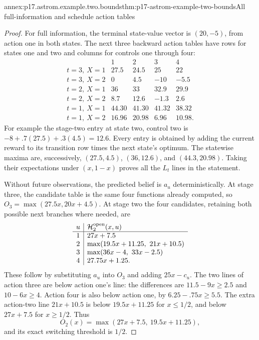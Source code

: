 \begin{annexitem}{annex:p17.astrom.example.two.bounds}{thm:p17-astrom-example-two-bounds}{All full-information and schedule action tables}
\begin{proof}
For full information, the terminal state-value vector
is \((20,-5)\), from action one in both states.
The next three backward action tables have rows
for states one and two and columns for controls
one through four:
\[
 \begin{array}{c|rrrr}
  &1&2&3&4\\ \hline
 t=3,\ X=1&27.5&24.5&25&22\\
 t=3,\ X=2&0&4.5&-10&-5.5\\ \hline
 t=2,\ X=1&36&33&32.9&29.9\\
 t=2,\ X=2&8.7&12.6&-1.3&2.6\\ \hline
 t=1,\ X=1&44.30&41.30&41.32&38.32\\
 t=1,\ X=2&16.96&20.98&6.96&10.98 .
 \end{array}
\]
For example the stage-two entry at state two, control
two is \(-8+.7(27.5)+.3(4.5)=12.6\).
Every entry is obtained by adding the current reward
to its transition row times the next state's optimum.
The statewise maxima are, successively,
\((27.5,4.5)\), \((36,12.6)\), and \((44.3,20.98)\).
Taking their expectations under \((x,1-x)\) proves
all the \(L_t\) lines in the statement.

Without future observations, the predicted belief
is \(a_u\) deterministically. At stage three, the
candidate table is the same four functions already
computed, so \(O_3=\max(27.5x,20x+4.5)\).
At stage two the four candidates, retaining both
possible next branches where needed, are
\[
 \begin{array}{c|l}
 u&\mathcal H_2^{\rm open}(x,u)\\ \hline
 1&27x+7.5\\
 2&\max(19.5x+11.25,\ 21x+10.5)\\
 3&\max(36x-4,\ 33x-2.5)\\
 4&27.75x+1.25 .
 \end{array}
\]
These follow by substituting \(a_u\) into \(O_3\)
and adding \(25x-c_u\).
The two lines of action three are below action one's
line: the differences are \(11.5-9x\geq2.5\)
and \(10-6x\geq4\). Action four is also below
action one, by \(6.25-.75x\geq5.5\).
The extra action-two line \(21x+10.5\) is below
\(19.5x+11.25\) for \(x\leq1/2\), and below
\(27x+7.5\) for \(x\geq1/2\).
Thus
\[
                 O_2(x)=\max(27x+7.5,\ 19.5x+11.25),
\]
and its exact switching threshold is \(1/2\).


\end{proof}
\end{annexitem}
